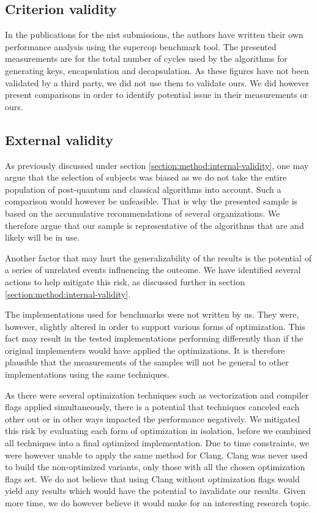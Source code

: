 \subsection{Criterion validity}

In the publications for the \gls{nist} submissions, the authors have written their own performance analysis using the \gls{supercop} benchmark tool. The presented measurements are for the total number of cycles used by the algorithms for generating keys, encapsulation and decapsulation. As these figures have not been validated by a third party, we did not use them to validate ours. We did however present comparisons in order to identify potential issue in their measurements or ours.

\subsection{External validity}

As previously discussed under section \ref{section:method:internal-validity}, one may argue that the selection of subjects was biased as we do not take the entire population of post-quantum and classical algorithms into account. Such a comparison would however be unfeasible. That is why the presented sample is based on the accumulative recommendations of several organizations. We therefore argue that our sample is representative of the algorithms that are and likely will be in use.

Another factor that may hurt the generalizability of the results is the potential of a series of unrelated events influencing the outcome. We have identified several actions to help mitigate this risk, as discussed further in section \ref{section:method:internal-validity}.

The implementations used for benchmarks were not written by us. They were, however, slightly altered in order to support various forms of optimization. This fact may result in the tested implementations performing differently than if the original implementers would have applied the optimizations. It is therefore plausible that the measurements of the samples will not be general to other implementations using the same techniques.

As there were several optimization techniques such as vectorization and compiler flags applied simultaneously, there is a potential that techniques canceled each other out or in other ways impacted the performance negatively. We mitigated this risk by evaluating each form of optimization in isolation, before we combined all techniques into a final optimized implementation. Due to time constraints, we were however unable to apply the same method for Clang. Clang was never used to build the non-optimized variants, only those with all the chosen optimization flags set. We do not believe that using Clang without optimization flags would yield any results which would have the potential to invalidate our results. Given more time, we do however believe it would make for an interesting research topic.

